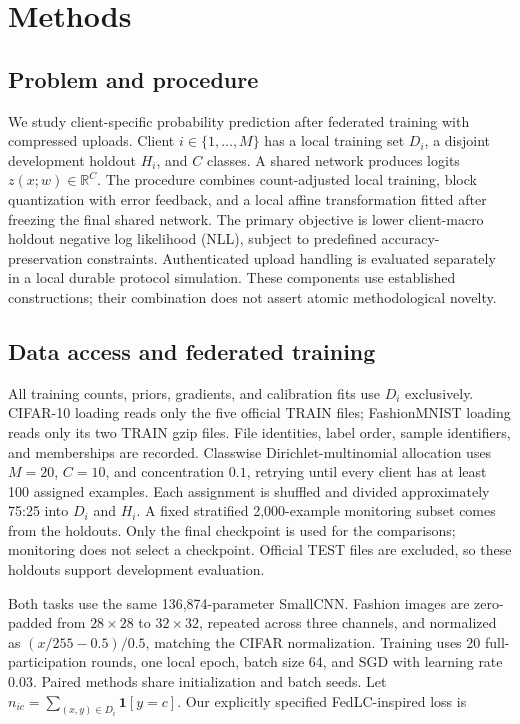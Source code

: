 \section{Methods}

\subsection{Problem and procedure}

We study client-specific probability prediction after federated training with compressed uploads. Client $i\in\{1,\ldots,M\}$ has a local training set $D_i$, a disjoint development holdout $H_i$, and $C$ classes. A shared network produces logits $z(x;w)\in\mathbb{R}^{C}$. The procedure combines count-adjusted local training, block quantization with error feedback, and a local affine transformation fitted after freezing the final shared network. The primary objective is lower client-macro holdout negative log likelihood (NLL), subject to predefined accuracy-preservation constraints. Authenticated upload handling is evaluated separately in a local durable protocol simulation. These components use established constructions; their combination does not assert atomic methodological novelty.

\subsection{Data access and federated training}

All training counts, priors, gradients, and calibration fits use $D_i$ exclusively. CIFAR-10 loading reads only the five official TRAIN files; FashionMNIST loading reads only its two TRAIN gzip files. File identities, label order, sample identifiers, and memberships are recorded. Classwise Dirichlet-multinomial allocation uses $M=20$, $C=10$, and concentration $0.1$, retrying until every client has at least 100 assigned examples. Each assignment is shuffled and divided approximately 75:25 into $D_i$ and $H_i$. A fixed stratified 2,000-example monitoring subset comes from the holdouts. Only the final checkpoint is used for the comparisons; monitoring does not select a checkpoint. Official TEST files are excluded, so these holdouts support development evaluation.

Both tasks use the same 136,874-parameter SmallCNN. Fashion images are zero-padded from $28\times28$ to $32\times32$, repeated across three channels, and normalized as $(x/255-0.5)/0.5$, matching the CIFAR normalization. Training uses 20 full-participation rounds, one local epoch, batch size 64, and SGD with learning rate $0.03$. Paired methods share initialization and batch seeds. Let $n_{ic}=\sum_{(x,y)\in D_i}\mathbf{1}[y=c]$. Our explicitly specified FedLC-inspired loss is

